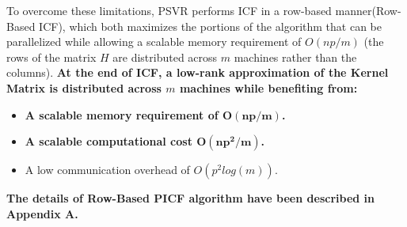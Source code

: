 \documentclass[12pt]{article}
\begin{document}
To overcome these limitations, PSVR performs ICF in a row-based manner(Row-Based ICF), which both maximizes the portions of the algorithm that can be parallelized while allowing a scalable memory requirement of $O(np/m)$ (the rows of the matrix $H$ are distributed across $m$ machines rather than the columns).
\newline\newline
{\bf At the end of ICF, a low-rank approximation of the Kernel Matrix is distributed across $m$ machines while benefiting from:}
\begin{itemize}
\item {\bf A scalable memory requirement of $\bm{O(np/m)}$.}
\item {\bf A scalable computational cost $\bm{O(np^2/m)}$.}
\item A low communication overhead of $O(p^2 log(m))$.
\end{itemize} 
{\bf The details of Row-Based PICF algorithm have been described in Appendix A.}
\end{document}
